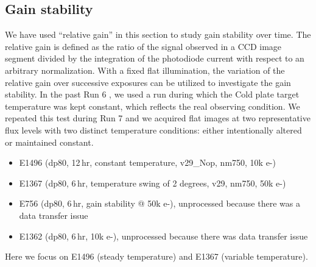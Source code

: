 \subsection{Gain stability}\label{sec:gain-stability-2}
We have used ``relative gain'' in this section to study gain stability over time.
The relative gain is defined as the ratio of the signal observed in a CCD image segment divided by the integration of the photodiode current with respect to an arbitrary normalization.
With a fixed flat illumination, the variation of the relative gain over successive exposures can be utilized to investigate the gain stability.
In the past Run 6 \citep{2024SPIE13103E..0WU}, we used a run during which the Cold plate target temperature was kept constant, which reflects the real observing condition. We repeated this test during Run 7 and we acquired flat images at two representative flux levels with two distinct temperature conditions: either intentionally altered or maintained constant.
\begin{itemize}
    \item E1496 (dp80, 12\,hr, constant temperature, v29\_Nop, nm750, 10k e-)
    \item E1367 (dp80, 6\,hr, temperature swing of 2 degrees, v29, nm750, 50k e-)
    \item E756 (dp80, 6\,hr, gain stability @ 50k e-), unprocessed because there was a data transfer issue
    \item E1362 (dp80, 6\,hr, 10k e-), unprocessed because there was data transfer issue
\end{itemize}

Here we focus on E1496 (steady temperature) and E1367 (variable temperature).

